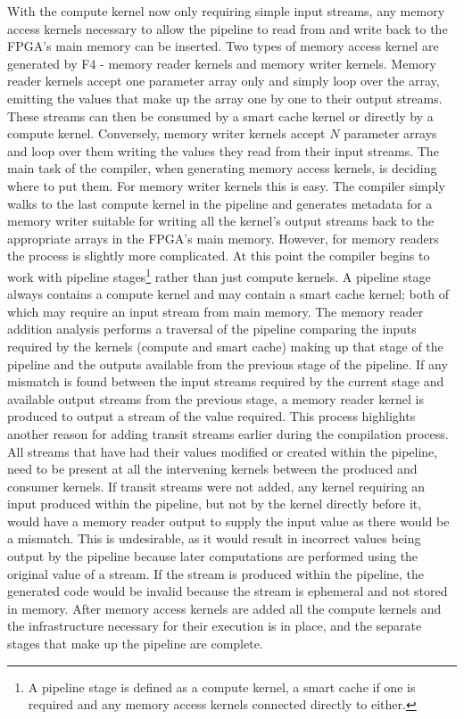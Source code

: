 \documentclass{mpaper}
\begin{document}
With the compute kernel now only requiring simple input streams, any memory access kernels necessary to allow the pipeline to read from and write back to the FPGA's main memory can be inserted.
Two types of memory access kernel are generated by F4 - memory reader kernels and memory writer kernels.
Memory reader kernels accept one parameter array only and simply loop over the array, emitting the values that make up the array one by one to their output streams.
These streams can then be consumed by a smart cache kernel or directly by a compute kernel.
Conversely, memory writer kernels accept $N$ parameter arrays and loop over them writing the values they read from their input streams. 
The main task of the compiler, when generating memory access kernels, is deciding where to put them. 
For memory writer kernels this is easy.
The compiler simply walks to the last compute kernel in the pipeline and generates metadata for a memory writer suitable for writing all the kernel's output streams back to the appropriate arrays in the FPGA's main memory.
However, for memory readers the process is slightly more complicated. 
At this point the compiler begins to work with pipeline stages\footnote{A pipeline stage is defined as a compute kernel, a smart cache if one is required and any memory access kernels connected directly to either.} rather than just compute kernels.
A pipeline stage always contains a compute kernel and may contain a smart cache kernel; both of which may require an input stream from main memory.
The memory reader addition analysis performs a traversal of the pipeline comparing the inputs required by the kernels (compute and smart cache) making up that stage of the pipeline and the outputs available from the previous stage of the pipeline.
If any mismatch is found between the input streams required by the current stage and available output streams from the previous stage, a memory reader kernel is produced to output a stream of the value required.
This process highlights another reason for adding transit streams earlier during the compilation process.
All streams that have had their values modified or created within the pipeline, need to be present at all the intervening kernels between the produced and consumer kernels.
If transit streams were not added, any kernel requiring an input produced within the pipeline, but not by the kernel directly before it, would have a memory reader output to supply the input value as there would be a mismatch. 
This is undesirable, as it would result in incorrect values being output by the pipeline because later computations are performed using the original value of a stream.
If the stream is produced within the pipeline, the generated code would be invalid because the stream is ephemeral and not stored in memory. 
After memory access kernels are added all the compute kernels and the infrastructure necessary for their execution is in place, and the separate stages that make up the pipeline are complete. 
\end{document}
